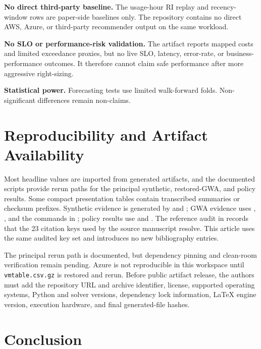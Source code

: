 \documentclass[11pt]{article}
\begin{document}
\textbf{No direct third-party baseline.} The usage-hour RI replay and
recency-window rows are paper-side baselines only. The repository contains no
direct AWS, Azure, or third-party recommender output on the same workload.

\textbf{No SLO or performance-risk validation.} The artifact reports mapped
costs and limited exceedance proxies, but no live SLO, latency, error-rate, or
business-performance outcomes. It therefore cannot claim safe performance
after more aggressive right-sizing.

\textbf{Statistical power.} Forecasting tests use limited walk-forward folds.
Non-significant differences remain non-claims.

\section{Reproducibility and Artifact Availability}

Most headline values are imported from generated artifacts, and the
documented scripts provide rerun paths for the principal synthetic,
restored-GWA, and policy results. Some compact presentation tables contain
transcribed summaries or checksum prefixes. Synthetic evidence is generated
by  and
; GWA evidence uses
,
, and the commands in
; policy results use
 and . The reference
audit in  records that the 23 citation keys used
by the source manuscript resolve. This article uses the same audited key set
and introduces no new bibliography entries.

The principal rerun path is documented, but dependency pinning and clean-room
verification remain pending. Azure is not reproducible in this workspace
until \texttt{vmtable.csv.gz} is restored and rerun. Before public artifact
release, the authors must add the repository URL and archive identifier,
license, supported operating systems, Python and solver versions, dependency
lock information, LaTeX engine version, execution hardware, and final
generated-file hashes.

\section{Conclusion}
\end{document}
